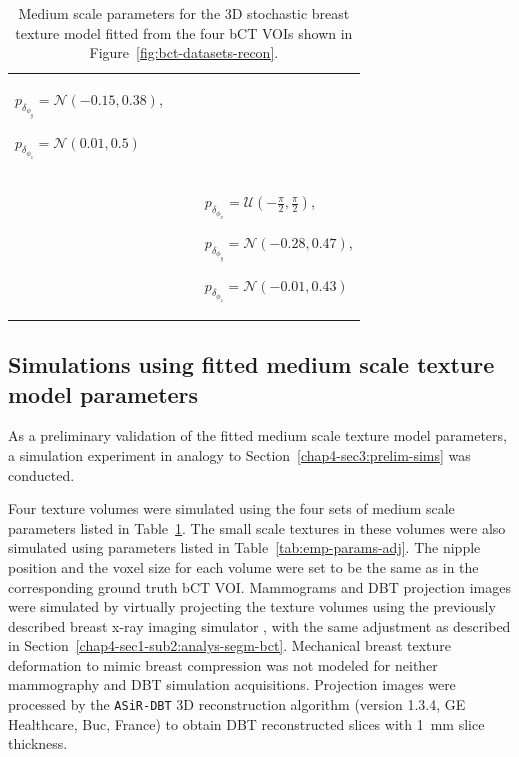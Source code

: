 \documentclass[journal]{IEEEtran}
\begin{document}
\begin{table}[!htb]
\begin{center}
\begin{tabular}{ m{1cm} m{2cm} m{2cm} m{2cm} }
        $p_{\delta_{\phi_y}} = \mathcal{N}(-0.15, 0.38)$,

        $p_{\delta_{\phi_z}} = \mathcal{N}(0.01, 0.5)$
        \tabularnewline%

      \cmidrule(lr){1-1} \cmidrule(lr){2-2}
      \cmidrule(lr){3-3} \cmidrule(lr){4-4}

      \centering{\#11}
      & \centering{$\kappa = 3.405e-03$, $\lambda_0 = 1.923e-02$,
        $R =
        3.853$}
      & \centering{$p_{L_a} = \mathcal{N}(6.06, 1.39)$,
        $p_{L_b} = \mathcal{N}(2.79, 0.56)$,
        $p_{L_c} = \mathcal{N}(2.10, 0.54)$}
      & $p_{\delta_{\phi_x}} = \mathcal{U}(-\frac{\pi}{2},
        \frac{\pi}{2})$,

        $p_{\delta_{\phi_y}} = \mathcal{N}(-0.28, 0.47)$,

        $p_{\delta_{\phi_z}} = \mathcal{N}(-0.01, 0.43)$
        \tabularnewline%

      \bottomrule

    \end{tabular}

    \caption{Medium scale parameters for the 3D stochastic breast
      texture model fitted from the four bCT VOIs shown in
      Figure~\ref{fig:bct-datasets-recon}.}
    \label{tab:summary-inferred-params}
  \end{center}
\end{table}


\subsection{Simulations using fitted medium scale texture model
  parameters}
\label{chap04-sec4-sub3:simulations}

As a preliminary validation of the fitted medium scale texture model
parameters, a simulation experiment in analogy to
Section~\ref{chap4-sec3:prelim-sims} was conducted.

Four texture volumes were simulated using the four sets of medium
scale parameters listed in
Table~\ref{tab:summary-inferred-params}. The small scale textures in
these volumes were also simulated using parameters listed in
Table~\ref{tab:emp-params-adj}. The nipple position and the voxel size
for each volume were set to be the same as in the corresponding ground
truth bCT VOI. Mammograms and DBT projection images were simulated by
virtually projecting the texture volumes using the previously
described breast x-ray imaging simulator \cite{milioni2014low}, with
the same adjustment as described in
Section~\ref{chap4-sec1-sub2:analys-segm-bct}. Mechanical breast
texture deformation to mimic breast compression was not modeled for
neither mammography and DBT simulation acquisitions. Projection images
were processed by the \texttt{ASiR-DBT} 3D reconstruction algorithm
(version 1.3.4, GE Healthcare, Buc, France) to obtain DBT
reconstructed slices with \SI{1}{\mm} slice thickness.
\end{document}
